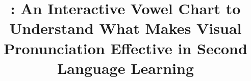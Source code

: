 \documentclass[sigconf,screen,nonacm]{acmart}
\begin{document}
\title[\visowel{}]{\visowel{}: An Interactive Vowel Chart to Understand What Makes Visual Pronunciation Effective in Second Language Learning}

\begin{abstract}

\end{abstract}

\maketitle


% 


% 







\appendix


\end{document}

